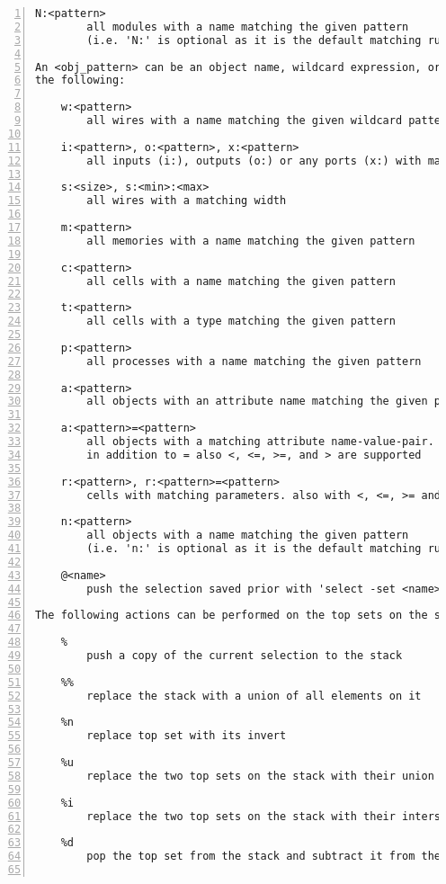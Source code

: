 \begin{lstlisting}[numbers=left,frame=single]
    N:<pattern>
        all modules with a name matching the given pattern
        (i.e. 'N:' is optional as it is the default matching rule)

An <obj_pattern> can be an object name, wildcard expression, or one of
the following:

    w:<pattern>
        all wires with a name matching the given wildcard pattern

    i:<pattern>, o:<pattern>, x:<pattern>
        all inputs (i:), outputs (o:) or any ports (x:) with matching names

    s:<size>, s:<min>:<max>
        all wires with a matching width

    m:<pattern>
        all memories with a name matching the given pattern

    c:<pattern>
        all cells with a name matching the given pattern

    t:<pattern>
        all cells with a type matching the given pattern

    p:<pattern>
        all processes with a name matching the given pattern

    a:<pattern>
        all objects with an attribute name matching the given pattern

    a:<pattern>=<pattern>
        all objects with a matching attribute name-value-pair.
        in addition to = also <, <=, >=, and > are supported

    r:<pattern>, r:<pattern>=<pattern>
        cells with matching parameters. also with <, <=, >= and >.

    n:<pattern>
        all objects with a name matching the given pattern
        (i.e. 'n:' is optional as it is the default matching rule)

    @<name>
        push the selection saved prior with 'select -set <name> ...'

The following actions can be performed on the top sets on the stack:

    %
        push a copy of the current selection to the stack

    %%
        replace the stack with a union of all elements on it

    %n
        replace top set with its invert

    %u
        replace the two top sets on the stack with their union

    %i
        replace the two top sets on the stack with their intersection

    %d
        pop the top set from the stack and subtract it from the new top


\end{lstlisting}
